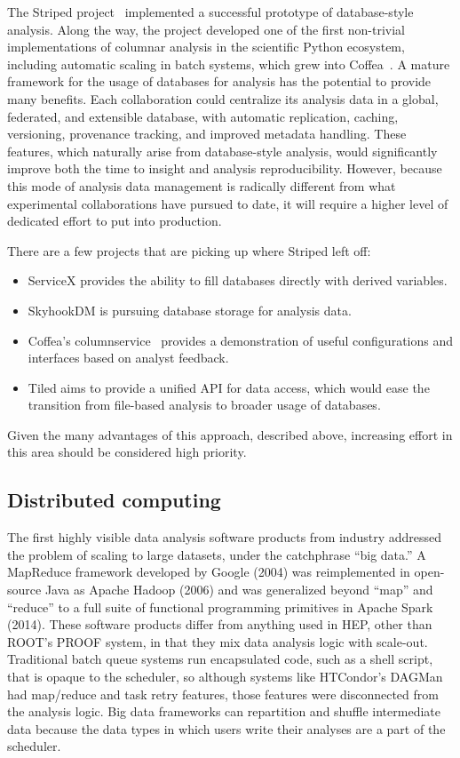 \documentclass{article}
\begin{document}
The Striped project~\cite{Chang:2017ske,Gutsche:2020kmd} implemented a successful prototype of database-style analysis. Along the way, the project developed one of the first non-trivial implementations of columnar analysis in the scientific Python ecosystem, including automatic scaling in batch systems, which grew into Coffea~\cite{Smith:2020pxs}. A mature framework for the usage of databases for analysis has the potential to provide many benefits. Each collaboration could centralize its analysis data in a global, federated, and extensible database, with automatic replication, caching, versioning, provenance tracking, and improved metadata handling. These features, which naturally arise from database-style analysis, would significantly improve both the time to insight and analysis reproducibility. However, because this mode of analysis data management is radically different from what experimental collaborations have pursued to date, it will require a higher level of dedicated effort to put into production.

There are a few projects that are picking up where Striped left off:
\begin{itemize}
\item{ServiceX provides the ability to fill databases directly with derived variables.}
\item{SkyhookDM is pursuing database storage for analysis data.}
\item{Coffea's columnservice~\cite{columnservice} provides a demonstration of useful configurations and interfaces based on analyst feedback.}
\item{Tiled aims to provide a unified API for data access, which would ease the transition from file-based analysis to broader usage of databases.}
\end{itemize}
Given the many advantages of this approach, described above, increasing effort in this area should be considered high priority.

\subsection{Distributed computing}

The first highly visible data analysis software products from industry addressed the problem of scaling to large datasets, under the catchphrase ``big data.'' A MapReduce framework developed by Google (2004) was reimplemented in open-source Java as Apache Hadoop (2006) and was generalized beyond ``map'' and ``reduce'' to a full suite of functional programming primitives in Apache Spark (2014). These software products differ from anything used in HEP, other than ROOT's PROOF system, in that they mix data analysis logic with scale-out. Traditional batch queue systems run encapsulated code, such as a shell script, that is opaque to the scheduler, so although systems like HTCondor's DAGMan had map/reduce and task retry features, those features were disconnected from the analysis logic. Big data frameworks can repartition and shuffle intermediate data because the data types in which users write their analyses are a part of the scheduler. 
\end{document}
